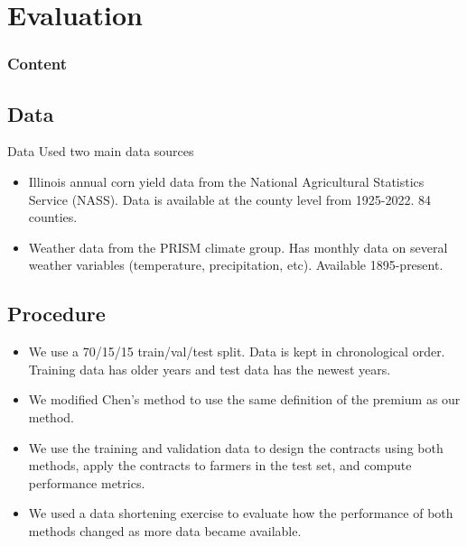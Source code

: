 \documentclass{beamer}
\begin{document}
\section{Evaluation}
\begin{frame}
    \frametitle{Content}
    \tableofcontents[currentsection]
  \end{frame}
\subsection{Data}
\begin{frame}{Data}
    Used two main data sources
    \begin{itemize}
        \setlength\itemsep{2em}
        \item Illinois annual corn yield data from the National Agricultural Statistics Service (NASS). Data is available at the county level from 1925-2022. 84 counties. 
        \item Weather data from the PRISM climate group. Has monthly data on several weather variables (temperature, precipitation, etc). Available 1895-present.
    \end{itemize}
\end{frame}

\subsection{Procedure}
\begin{frame}
    \begin{itemize}
        \setlength\itemsep{2em}
        \item We use a 70/15/15 train/val/test split. Data is kept in chronological order. Training data has older years and test data has the newest years. 
        \item We modified Chen's method to use the same definition of the premium as our method. 
        \item We use the training and validation data to design the contracts using both methods, apply the contracts to farmers in the test set, and compute performance metrics. 
        \item We used a data shortening exercise to evaluate how the performance of both methods changed as more data became available. 
    \end{itemize}
\end{frame}
\end{document}
